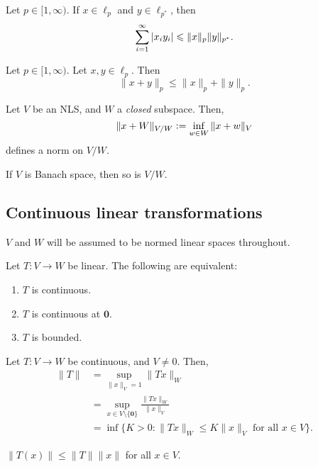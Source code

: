 \documentclass[12pt]{article}	%
\begin{document}
\begin{prop}
	Let $p \in [1, \infty)$. If $x \in \ell_{p}$ and $y \in \ell_{p^{\ast}}$, then 
	\begin{equation*} 
		\sum_{i = 1}^{\infty} {\left\lvert x_{i} y_{i} \right\lvert} \leqslant \|x\|_{p} \|y\|_{p^{\ast}}.
	\end{equation*}
\end{prop}

\begin{prop}
	Let $p \in [1, \infty)$. Let $x, y \in \ell_{p}$. Then
	\begin{equation*} 
		\|x + y\|_{p} \le \|x\|_{p} + \|y\|_{p}.
	\end{equation*}	
\end{prop}

\begin{prop}
	Let $V$ be an NLS, and $W$ a \emph{closed} subspace. Then, 
	\begin{equation*} 
		\|x + W\|_{V/W} \vcentcolon= \inf_{w \in W} \|x + w\|_{V}
	\end{equation*}
	defines a norm on $V/W$.

	If $V$ is Banach space, then so is $V/W$.
\end{prop}

\subsection{Continuous linear transformations}

$V$ and $W$ will be assumed to be normed linear spaces throughout.

\begin{prop}
	Let $T : V \to W$ be linear. The following are equivalent:
	\begin{enumerate}
		\item $T$ is continuous.
		\item $T$ is continuous at $\mathbf{0}$.
		\item $T$ is bounded.
	\end{enumerate}
\end{prop}

\begin{prop}
	Let $T : V \to W$ be continuous, and $V \neq 0$. Then,
	\begin{align*} 
		\|T\| &= \sup_{\|x\|_{V} = 1}\|T x\|_{W} \\
		&= \sup_{x \in V \setminus \{\mathbf{0}\}}\frac{\|T x\|_{W}}{\|x\|_{V}} \\
		&= \inf\{K > 0 : \|Tx\|_{W} \le K \|x\|_{V} \text{ for all } x \in V\}.
	\end{align*}
\end{prop}
\begin{cor}
	$\|T(x)\| \le \|T\| \|x\|$ for all $x \in V$.
\end{cor}
\end{document}
